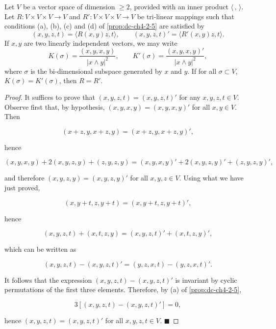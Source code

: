 \begin{lemma}
  \label{lem:dc-ch4-3-3}


  Let $V$ be a vector space of dimension $\geq 2$, provided with an inner product
  $\langle\,,\,\rangle$. Let $R:V\times V\times V\to V$ and $R':V\times V\times V\to V$
  be tri-linear mappings such that conditions (a), (b), (c) and (d) of \cref{prop:dc-ch4-2-5} are satisfied by
  $$
  (x,y,z,t)=\langle R(x,y)z,t\rangle,\qquad (x,y,z,t)'=\langle R'(x,y)z,t\rangle.
  $$
  If $x,y$ are two linearly independent vectors, we may write
  $$
  K(\sigma)=\frac{(x,y,x,y)}{|x\wedge y|^2},\qquad K'(\sigma)=\frac{(x,y,x,y)'}{|x\wedge y|^2},
  $$
  where $\sigma$ is the bi-dimensional subspace generated by $x$ and $y$. If for all
  $\sigma\subset V$, $K(\sigma)=K'(\sigma)$, then $R=R'$.
\end{lemma}
\begin{proof}

  \sketch
  It suffices to prove that $(x,y,z,t)=(x,y,z,t)'$ for any $x,y,z,t\in V$.
  Observe first that, by hypothesis, $(x,y,x,y)=(x,y,x,y)'$ for all $x,y\in V$. Then

  $$
  (x+z,y,x+z,y)=(x+z,y,x+z,y)',
  $$

  hence

  $$
  (x,y,x,y)+2(x,y,z,y)+(z,y,z,y)=(x,y,x,y)'+2(x,y,z,y)'+(z,y,z,y)',
  $$

  and therefore $(x,y,z,y)=(x,y,z,y)'$ for all $x,y,z\in V$. Using what we have just
  proved,

  $$
  (x,y+t,z,y+t)=(x,y+t,z,y+t)',
  $$

  hence

  $$
  (x,y,z,t)+(x,t,z,y)=(x,y,z,t)'+(x,t,z,y)',
  $$

  which can be written as

  $$
  (x,y,z,t)-(x,y,z,t)'=(y,z,x,t)-(y,z,x,t)'.
  $$

  It follows that the expression $(x,y,z,t)-(x,y,z,t)'$ is invariant by cyclic
  permutations of the first three elements. Therefore, by (a) of \cref{prop:dc-ch4-2-5},

  $$
  3[(x,y,z,t)-(x,y,z,t)']=0,
  $$

  hence $(x,y,z,t)=(x,y,z,t)'$ for all $x,y,z,t\in V$. $\blacksquare$
\end{proof}

